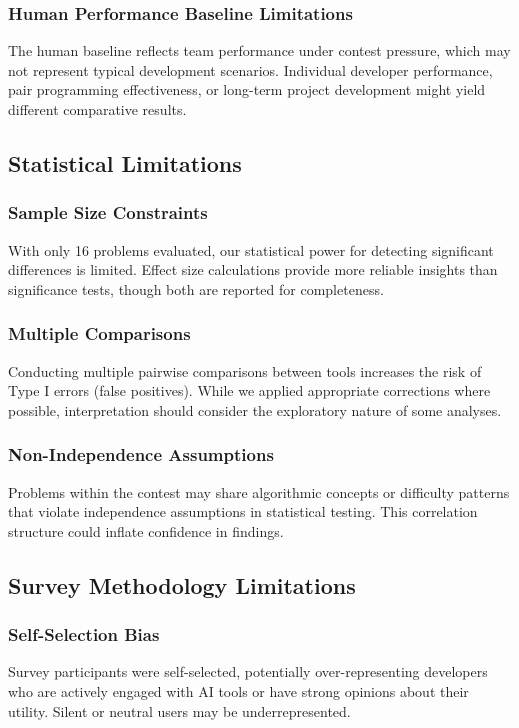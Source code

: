 \documentclass[conference]{IEEEtran}
\begin{document}
\subsubsection{Human Performance Baseline Limitations}
The human baseline reflects team performance under contest pressure, which may not represent typical development scenarios. Individual developer performance, pair programming effectiveness, or long-term project development might yield different comparative results.

\subsection{Statistical Limitations}

\subsubsection{Sample Size Constraints}
With only 16 problems evaluated, our statistical power for detecting significant differences is limited. Effect size calculations provide more reliable insights than significance tests, though both are reported for completeness.

\subsubsection{Multiple Comparisons}
Conducting multiple pairwise comparisons between tools increases the risk of Type I errors (false positives). While we applied appropriate corrections where possible, interpretation should consider the exploratory nature of some analyses.

\subsubsection{Non-Independence Assumptions}
Problems within the contest may share algorithmic concepts or difficulty patterns that violate independence assumptions in statistical testing. This correlation structure could inflate confidence in findings.

\subsection{Survey Methodology Limitations}

\subsubsection{Self-Selection Bias}
Survey participants were self-selected, potentially over-representing developers who are actively engaged with AI tools or have strong opinions about their utility. Silent or neutral users may be underrepresented.
\end{document}
